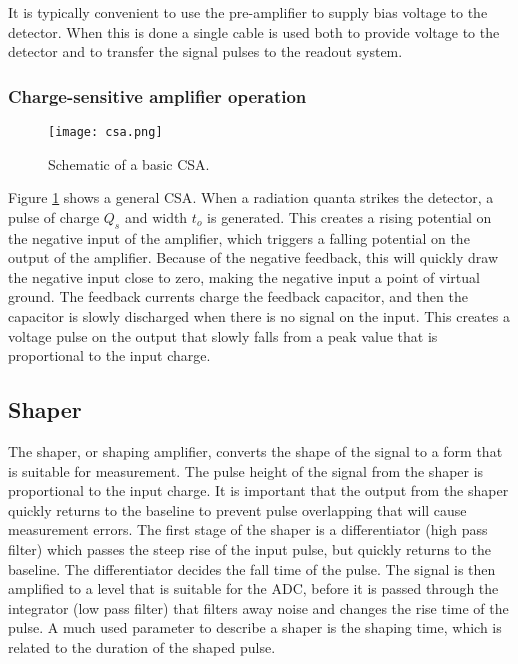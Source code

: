 \documentclass[../main/thesis.tex]{subfiles}
\begin{document}
It is typically convenient to use the pre-amplifier to supply bias voltage to the detector. When this is done a single cable is used both to provide voltage to the detector and to transfer the signal pulses to the readout system. \citep[chap. 16]{Knoll}

\subsubsection{Charge-sensitive amplifier operation}
\label{t-csa}
\begin{figure}%
	\centering
	\texttt{[image: csa.png]}
	\caption{Schematic of a basic \gls{CSA}. \citep{Hamamatsu}}
	\label{fig-csa}
\end{figure}

Figure \ref{fig-csa} shows a general \gls{CSA}. When a radiation quanta strikes the detector, a pulse of charge $Q_s$ and width $t_o$ is generated. This creates a rising potential on the negative input of the amplifier, which triggers a falling potential on the output of the amplifier. Because of the negative feedback, this will quickly draw the negative input close to zero, making the negative input a point of virtual ground. The feedback currents charge the feedback capacitor, and then the capacitor is slowly discharged when there is no signal on the input. This creates a voltage pulse on the output that slowly falls from a peak value that is proportional to the input charge. \citep{Hamamatsu}



\subsection{Shaper}
\label{t-shaper}
The shaper, or shaping amplifier, converts the shape of the signal to a form that is suitable for measurement. The pulse height of the signal from the shaper is proportional to the input charge. It is important that the output from the shaper quickly returns to the baseline to prevent pulse overlapping that will cause measurement errors. The first stage of the shaper is a differentiator (high pass filter) which passes the steep rise of the input pulse, but quickly returns to the baseline. The differentiator decides the fall time of the pulse. The signal is then amplified to a level that is suitable for the \gls{ADC}, before it is passed through the integrator (low pass filter) that filters away noise and changes the rise time of the pulse. A much used parameter to describe a shaper is the shaping time, which is related to the duration of the shaped pulse. \citep[chap. 16]{Knoll}
\end{document}
